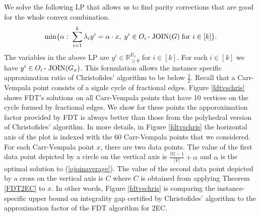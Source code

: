 

 We solve the following LP that allows us to find parity corrections that are good for the whole convex combination.
\begin{equation}\label{ojoinaverage}
\min \{ \alpha:\;\sum_{i=1}^{k} \lambda_i y^i = \alpha \cdot x,\;  y^i \in O_i\operatorname{-\;JOIN}(G) \; \mbox{for $i\in [k]$}\}.
\end{equation}
The variables in the above LP are $y^i\in \mathbb{R}^{E_x}_{
\geq 0}$ for $i\in [k]$. For each $i\in [k]$ we have $y^i\in O_i\operatorname{-\;JOIN}(G_x)$. This formulation allows the instance specific approximation ratio of Christofides' algorithm to be below $\frac{3}{2}$. Recall that a Carr-Vempala point consists of a signle cycle of fractional edges.  Figure \ref{fdtvschris} shows FDT's solutions on all Carr-Vempala points that have 10 vertices on the cycle formed by fractional edges. We show for these points the apporoximation factor provided by FDT is always better than those from the polyhedral version of Christofides' algorithm. In more details, in Figure \ref{fdtvschris} the horizontal axis of the plot is indexed with the 60 Carr-Vempala points that we considered. For each Carr-Vempala point $x$, there are two data points. The value of the first data point depicted by a circle on the vertical axis is $\frac{|V|-1}{|V|}+\alpha$  and $\alpha$ is the optimal solution to (\ref{ojoinaverage}). 
The value of the second data point depicted by a cross on the vertical axis is $C$ where $C$ is obtained from applying Theorem \ref{FDT2EC} to $x$. In other words, Figure \ref{fdtvschris} is comparing the instance-specific upper bound on integrality gap certified by Christofides' algorithm to the approximation factor of the FDT algorithm for 2EC.

